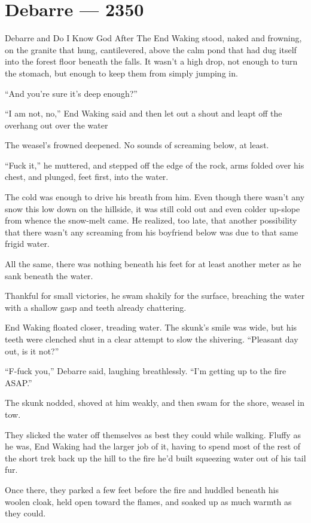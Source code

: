 \hypertarget{debarre-2350}{%
\chapter{Debarre — 2350}\label{debarre-2350}}

Debarre and Do I Know God After The End Waking stood, naked and frowning, on the granite that hung, cantilevered, above the calm pond that had dug itself into the forest floor beneath the falls. It wasn't a high drop, not enough to turn the stomach, but enough to keep them from simply jumping in.

``And you're sure it's deep enough?''

``I am not, no,'' End Waking said and then let out a shout and leapt off the overhang out over the water

The weasel's frowned deepened. No sounds of screaming below, at least.

``Fuck it,'' he muttered, and stepped off the edge of the rock, arms folded over his chest, and plunged, feet first, into the water.

The cold was enough to drive his breath from him. Even though there wasn't any snow this low down on the hillside, it was still cold out and even colder up-slope from whence the snow-melt came. He realized, too late, that another possibility that there wasn't any screaming from his boyfriend below was due to that same frigid water.

All the same, there was nothing beneath his feet for at least another meter as he sank beneath the water.

Thankful for small victories, he swam shakily for the surface, breaching the water with a shallow gasp and teeth already chattering.

End Waking floated closer, treading water. The skunk's smile was wide, but his teeth were clenched shut in a clear attempt to slow the shivering. ``Pleasant day out, is it not?''

``F-fuck you,'' Debarre said, laughing breathlessly. ``I'm getting up to the fire ASAP.''

The skunk nodded, shoved at him weakly, and then swam for the shore, weasel in tow.

They slicked the water off themselves as best they could while walking. Fluffy as he was, End Waking had the larger job of it, having to spend most of the rest of the short trek back up the hill to the fire he'd built squeezing water out of his tail fur.

Once there, they parked a few feet before the fire and huddled beneath his woolen cloak, held open toward the flames, and soaked up as much warmth as they could.

